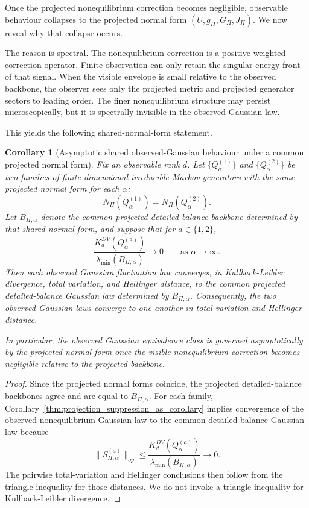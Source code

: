 \documentclass[11pt,a4paper]{article}
\numberwithin{equation}{section}
\theoremstyle{thmcompact}
\newtheorem{corollary}[theorem]{Corollary}
\theoremstyle{remark}
\begin{document}
Once the projected nonequilibrium correction becomes negligible, observable behaviour collapses to the projected normal form \((U,g_\Pi,G_\Pi,J_\Pi)\). We now reveal why that collapse occurs.

The reason is spectral. The nonequilibrium correction is a positive weighted correction operator. Finite observation can only retain the singular-energy front of that signal. When the visible envelope is small relative to the observed backbone, the observer sees only the projected metric and projected generator sectors to leading order. The finer nonequilibrium structure may persist microscopically, but it is spectrally invisible in the observed Gaussian law.

This yields the following shared-normal-form statement.

\begin{corollary}[Asymptotic shared observed-Gaussian behaviour under a common projected normal form]
\label{thm:observable_universality_from_shadow}
Fix an observable rank \(d\). Let \(\{Q^{(1)}_\alpha\}\) and \(\{Q^{(2)}_\alpha\}\) be two families of finite-dimensional irreducible Markov generators with the same projected normal form for each \(\alpha\):
\begin{equation}
N_\Pi(Q^{(1)}_\alpha)=N_\Pi(Q^{(2)}_\alpha).
\end{equation}
Let \(B_{\Pi,\alpha}\) denote the common projected detailed-balance backbone determined by that shared normal form, and suppose that for \(a\in\{1,2\}\),
\begin{equation}
\frac{K_d^{DV}(Q^{(a)}_\alpha)}{\lambda_{\min}(B_{\Pi,\alpha})}\to 0
\qquad\text{as }\alpha\to\infty.
\end{equation}
Then each observed Gaussian fluctuation law converges, in Kullback-Leibler divergence, total variation, and Hellinger distance, to the common projected detailed-balance Gaussian law determined by \(B_{\Pi,\alpha}\). Consequently, the two observed Gaussian laws converge to one another in total variation and Hellinger distance.

In particular, the observed Gaussian equivalence class is governed asymptotically by the projected normal form once the visible nonequilibrium correction becomes negligible relative to the projected backbone.
\end{corollary}

\begin{proof}
Since the projected normal forms coincide, the projected detailed-balance backbones agree and are equal to \(B_{\Pi,\alpha}\). For each family, Corollary~\ref{thm:projection_suppression_as_corollary} implies convergence of the observed nonequilibrium Gaussian law to the common detailed-balance Gaussian law because
\begin{equation}
\|S_{\Pi,\alpha}^{(a)}\|_{op}
\le
\frac{K_d^{DV}(Q^{(a)}_\alpha)}{\lambda_{\min}(B_{\Pi,\alpha})}
\to 0.
\end{equation}
The pairwise total-variation and Hellinger conclusions then follow from the triangle inequality for those distances. We do not invoke a triangle inequality for Kullback-Leibler divergence.
\end{proof}
\end{document}
